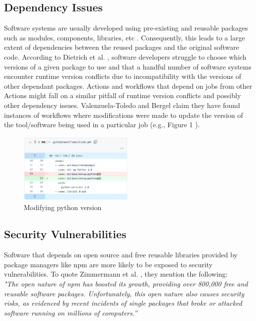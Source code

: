 \documentclass[conference]{IEEEtran}
\begin{document}
    \subsection{Dependency Issues}
        Software systems are usually developed using pre-existing and reusable packages such as modules, components, libraries, etc \cite{decan2019empirical}\cite{soto2021comprehensive}. Consequently, this leads to a large extent of dependencies between the reused packages and the original software code. According to Dietrich et al. \cite{dietrich2019dependency}, software developers struggle to choose which versions of a given package to use and that a handful number of software systems encounter runtime version conflicts due to incompatibility with the versions of other dependant packages. Actions and workflows that depend on jobs from other Actions might fall on a similar pitfall of runtime version conflicts and possibly other dependency issues. Valenzuela-Toledo and Bergel \cite{valenzuela2022evolution} claim they have found instances of workflows where modifications were made to update the version of the tool/software being used in a particular job (e.g., Figure 1 \cite{valenzuela2022evolution}  ).

\begin{figure} [h]
\includegraphics[width=0.5\textwidth]{Figure 1.png}
\caption{Modifying python version \cite{valenzuela2022evolution} }
\end{figure}

    \subsection{Security Vulnerabilities}
        Software that depends on open source and free reusable libraries provided by package managers like npm are more likely to be exposed to security vulnerabilities. To quote Zimmermann et al. \cite{zimmermann2019small}, they mention the following: \\

        \textit{"The open nature of npm has boosted its growth, providing over 800,000 free and reusable software packages. Unfortunately, this open nature also causes security risks, as evidenced by recent incidents of single packages that broke or attacked software running on millions of computers.”} \\
\end{document}
